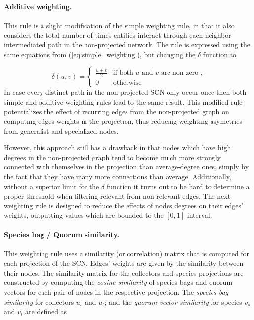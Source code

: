 \paragraph*{Additive weighting.}
This rule is a slight modification of the simple weighting rule, in that it also considers the total number of times entities interact through each neighbor-intermediated path in the non-projected network. The rule is expressed using the same equations from (\ref{eq:simple_weighting}), but changing the $\delta$ function to
 
$$\delta(u,v) = 
\begin{cases}
\frac{u+v}{2} &  \mbox{if both } u \mbox{ and } v \mbox{ are non-zero ,}\\
0 & \mbox{otherwise}
\end{cases}
$$
In case every distinct path in the non-projected SCN only occur once then both simple and additive weighting rules lead to the same result. %
This modified rule potentializes the effect of recurring edges from the non-projected graph on computing edges weights in the projection, thus reducing weighting asymetries from generalist and specialized nodes.

However, this approach still has a drawback in that nodes which have high degrees in the non-projected graph tend to become much more strongly connected with themselves in the projection than average-degree ones, simply by the fact that they have many more connections than average.
Additionally, without a superior limit for the $\delta$ function it turns out to be hard to determine a proper threshold when filtering relevant from non-relevant edges. The next weighting rule is designed to reduce the effects of nodes degrees on their edges' weights, outputting values which are bounded to the $[0,1]$ interval.

\paragraph*{Species bag / Quorum similarity.}
This weighting rule uses a similarity (or correlation) matrix that is computed for each projection of the SCN. Edges' weights are given by the similarity between their nodes. The similarity matrix for the collectors and species projections are constructed by computing the  \textit{cosine similarity} of species bags and quorum vectors  for each pair of nodes in the respective projection. 
The \textit{species bag similarity} for collectors $u_s$ and $u_t$; and the \textit{quorum vector similarity} for species $v_s$ and $v_t$ are defined as

